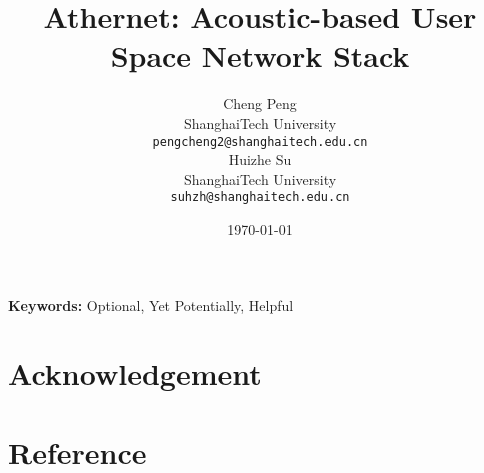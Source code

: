 \documentclass[10pt]{article}
\title{Athernet: Acoustic-based User Space Network Stack}
\author{
  Cheng Peng \\
   ShanghaiTech University   \\
  {\tt pengcheng2@shanghaitech.edu.cn} \\\And
 Huizhe Su \\
   ShanghaiTech University  \\
  {\tt suhzh@shanghaitech.edu.cn} \\}
\date{\today}
\begin{document}
\maketitle
\begin{abstract}
  \lipsum[1]
\end{abstract}

{\bf Keywords:} Optional, Yet Potentially, Helpful












\section*{Acknowledgement}
\lipsum[22]
\section*{Reference}
\lipsum[23]
% 
\end{document}
